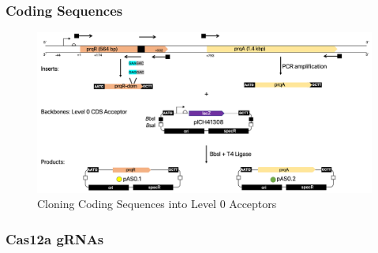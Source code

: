 \subsubsection{Coding Sequences}

\begin{figure}[H]
    \centering
    \includegraphics[width=\hsize]{figs/CDS.png}
    \caption{Cloning Coding Sequences into Level 0 Acceptors}
\end{figure}

\subsubsection{Cas12a gRNAs}

